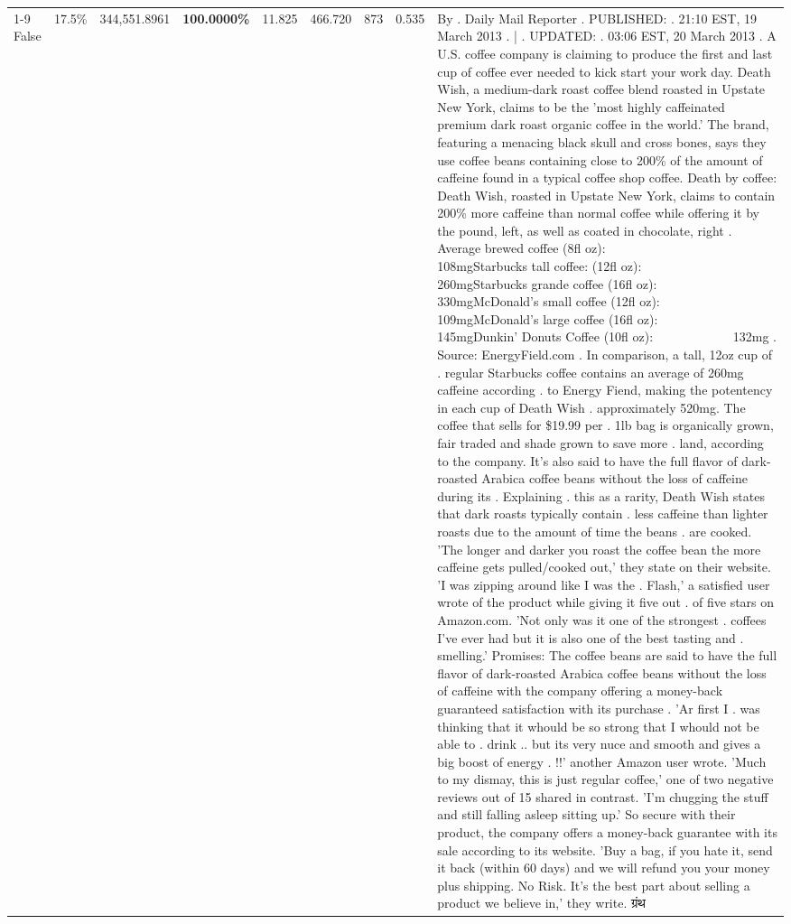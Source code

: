 \begin{table}[H]
{\begin{tabular}{lllrlllll}
\cline{1-9}
False & 17.5\% & 344,551.8961 & \bfseries \color{red} 100.0000\% & 11.825 & 466.720 & 873 & 0.535 & By . Daily Mail Reporter . PUBLISHED: . 21:10 EST, 19 March 2013 . | . UPDATED: . 03:06 EST, 20 March 2013 . A U.S. coffee company is claiming to produce the first and last cup of coffee ever needed to kick start your work day. Death Wish, a medium-dark roast coffee blend roasted in Upstate New York, claims to be the 'most highly caffeinated premium dark roast organic coffee in the world.' The brand, featuring a menacing black skull and cross bones, says they use coffee beans containing close to 200\% of the amount of caffeine found in a typical coffee shop coffee. Death by coffee: Death Wish, roasted in Upstate New York, claims to contain 200\% more caffeine than normal coffee while offering it by the pound, left, as well as coated in chocolate, right . Average brewed coffee (8fl oz):              108mgStarbucks tall coffee: (12fl oz):                260mgStarbucks grande coffee (16fl oz):         330mgMcDonald's small coffee (12fl oz):           109mgMcDonald's large coffee (16fl oz):           145mgDunkin' Donuts Coffee (10fl oz):             132mg . Source: EnergyField.com . In comparison, a tall, 12oz cup of . regular Starbucks coffee contains an average of 260mg caffeine according . to Energy Fiend, making the potentency in each cup of Death Wish . approximately 520mg. The coffee that sells for \$19.99 per . 1lb bag is organically grown, fair traded and shade grown to save more . land, according to the company. It's also said to have the full flavor of dark-roasted Arabica coffee beans without the loss of caffeine during its . Explaining . this as a rarity, Death Wish states that dark roasts typically contain . less caffeine than lighter roasts due to the amount of time the beans . are cooked. 'The longer and darker you roast the coffee bean the more caffeine gets pulled/cooked out,' they state on their website. 'I was zipping around like I was the . Flash,' a satisfied user wrote of the product while giving it five out . of five stars on Amazon.com. 'Not only was it one of the strongest . coffees I've ever had but it is also one of the best tasting and . smelling.’ Promises: The coffee beans are said to have the full flavor of dark-roasted Arabica coffee beans without the loss of caffeine with the company offering a money-back guaranteed satisfaction with its purchase . 'Ar first I . was thinking that it whould be so strong that I whould not be able to . drink .. but its very nuce and smooth and gives a big boost of energy . !!' another Amazon user wrote. 'Much to my dismay, this is just regular coffee,' one of two negative reviews out of 15 shared in contrast. 'I'm chugging the stuff and still falling asleep sitting up.' So secure with their product, the company offers a money-back guarantee with its sale according to its website. 'Buy a bag, if you hate it, send it back (within 60 days) and we will refund you your money plus shipping. No Risk. It’s the best part about selling a product we believe in,' they write. ग्रंथ \\

\end{tabular}}
\end{table}
